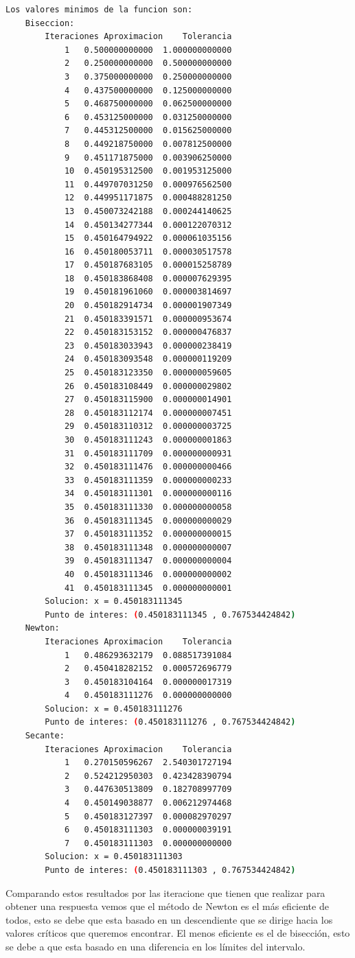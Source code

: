 \begin{lstlisting}[language=bash]
    Los valores minimos de la funcion son:
	Biseccion:
		Iteraciones	Aproximacion	Tolerancia
			1	0.500000000000	1.000000000000
			2	0.250000000000	0.500000000000
			3	0.375000000000	0.250000000000
			4	0.437500000000	0.125000000000
			5	0.468750000000	0.062500000000
			6	0.453125000000	0.031250000000
			7	0.445312500000	0.015625000000
			8	0.449218750000	0.007812500000
			9	0.451171875000	0.003906250000
			10	0.450195312500	0.001953125000
			11	0.449707031250	0.000976562500
			12	0.449951171875	0.000488281250
			13	0.450073242188	0.000244140625
			14	0.450134277344	0.000122070312
			15	0.450164794922	0.000061035156
			16	0.450180053711	0.000030517578
			17	0.450187683105	0.000015258789
			18	0.450183868408	0.000007629395
			19	0.450181961060	0.000003814697
			20	0.450182914734	0.000001907349
			21	0.450183391571	0.000000953674
			22	0.450183153152	0.000000476837
			23	0.450183033943	0.000000238419
			24	0.450183093548	0.000000119209
			25	0.450183123350	0.000000059605
			26	0.450183108449	0.000000029802
			27	0.450183115900	0.000000014901
			28	0.450183112174	0.000000007451
			29	0.450183110312	0.000000003725
			30	0.450183111243	0.000000001863
			31	0.450183111709	0.000000000931
			32	0.450183111476	0.000000000466
			33	0.450183111359	0.000000000233
			34	0.450183111301	0.000000000116
			35	0.450183111330	0.000000000058
			36	0.450183111345	0.000000000029
			37	0.450183111352	0.000000000015
			38	0.450183111348	0.000000000007
			39	0.450183111347	0.000000000004
			40	0.450183111346	0.000000000002
			41	0.450183111345	0.000000000001
		Solucion: x = 0.450183111345
		Punto de interes: (0.450183111345 , 0.767534424842)
	Newton:
		Iteraciones	Aproximacion	Tolerancia
			1	0.486293632179	0.088517391084
			2	0.450418282152	0.000572696779
			3	0.450183104164	0.000000017319
			4	0.450183111276	0.000000000000
		Solucion: x = 0.450183111276
		Punto de interes: (0.450183111276 , 0.767534424842)
	Secante:
		Iteraciones	Aproximacion	Tolerancia
			1	0.270150596267	2.540301727194
			2	0.524212950303	0.423428390794
			3	0.447630513809	0.182708997709
			4	0.450149038877	0.006212974468
			5	0.450183127397	0.000082970297
			6	0.450183111303	0.000000039191
			7	0.450183111303	0.000000000000
		Solucion: x = 0.450183111303
		Punto de interes: (0.450183111303 , 0.767534424842)
\end{lstlisting}

Comparando estos resultados por las iteracione que tienen que realizar para obtener una respuesta vemos que el método de Newton es el más eficiente de todos, esto se debe que esta basado en un descendiente que se dirige hacia los valores críticos que queremos encontrar. El menos eficiente es el de bisección, esto se debe a que esta basado en una diferencia en los límites del intervalo.


